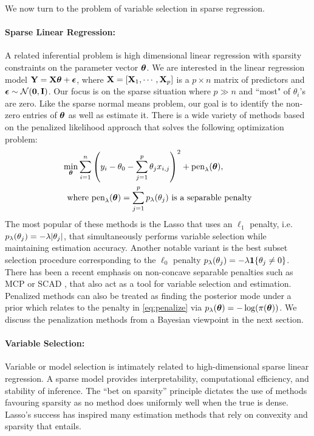 \documentclass[11pt]{article}
\begin{document}
We now turn to the problem of variable selection in sparse regression. 

\paragraph{Sparse Linear Regression:} A related inferential problem is high dimensional linear regression with sparsity constraints on the parameter vector $\boldsymbol{\theta}$. We are interested in the linear regression model ${\bf Y} = {\bf X} \boldsymbol{\theta} + \boldsymbol{\epsilon}$, where ${\bf X} = [{\bf X}_1, \cdots, {\bf X}_p]$ is a $p \times n$ matrix of predictors and $\boldsymbol{\epsilon} \sim {\cal N}({\bf 0}, {\bf I})$. Our focus is on the sparse situation where $p \gg n$ and ``most" of $\theta_i$'s are zero. Like the sparse normal means problem, our goal is to identify the non-zero entries of $\boldsymbol{\theta}$ as well as estimate it. There is a wide variety of methods based on the penalized likelihood approach that solves the following optimization problem:
\begin{align}
\min_{\boldsymbol{\theta}} \sum_{i=1}^{n} &  \left( y_i - \theta_0 - \sum_{j=1}^{p} \theta_j x_{i,j} \right)^2 + \text{pen}_{\lambda}(\boldsymbol{\theta}), \label{eq:penalize} \\
\text{where } & \text{pen}_{\lambda}(\boldsymbol{\theta}) = \sum_{j=1}^{p} p_{\lambda}(\theta_j) \text{ is a separable penalty} \nonumber
\end{align}
 The most popular of these methods is the Lasso that uses an $\ell_1$ penalty, i.e. $p_{\lambda}(\theta_j) = -\lambda \lvert\theta_j\rvert$, that simultaneously performs variable selection while maintaining estimation accuracy. Another notable variant is the best subset selection procedure corresponding to the $\ell_0$ penalty $p_{\lambda}(\theta_j) = -\lambda {\bf 1}\{\theta_j \ne 0\}$. There has been a recent emphasis on non-concave separable penalties such as MCP \citep{zhang2010nearly} or SCAD \citep{fan2001variable}, that also act as a tool for variable selection and estimation. Penalized methods can also be treated as finding the posterior mode under a prior which relates to the penalty in \eqref{eq:penalize} via $p_{\lambda}(\boldsymbol{\theta}) = -\log(\pi(\boldsymbol{\theta}))$. We discuss the penalization methods from a Bayesian viewpoint in the next section. 

\paragraph{Variable Selection:} Variable or model selection is intimately related to high-dimensional sparse linear regression.  A sparse model provides interpretability, computational efficiency, and stability of inference.  The ``bet on sparsity'' principle \citep{hastie09} dictates the use of methods favouring sparsity as no method does uniformly well when the true is dense. Lasso's success has inspired many estimation methods that rely on convexity and sparsity that entails. 
\end{document}
